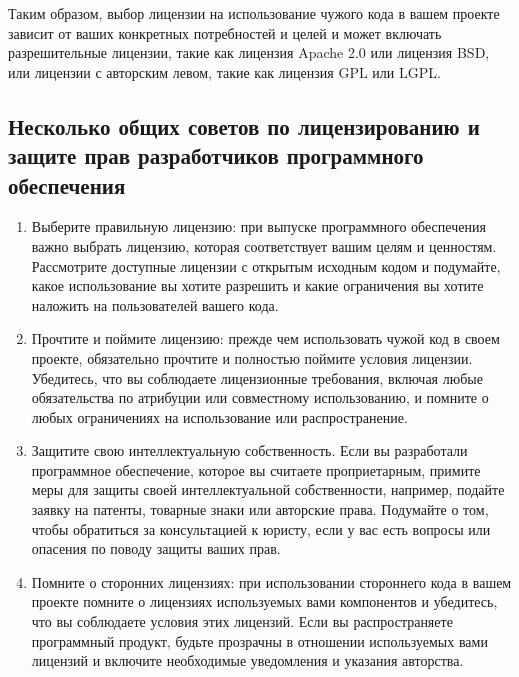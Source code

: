 \documentclass[letterpaper,10pt,russian]{sphinxmanual}
\begin{document}
\sphinxAtStartPar
Таким образом, выбор лицензии на использование чужого кода в вашем проекте зависит от ваших конкретных потребностей и целей и может включать разрешительные лицензии, такие как лицензия Apache 2.0 или лицензия BSD, или лицензии с авторским левом, такие как лицензия GPL или LGPL.


\subsection{Несколько общих советов по лицензированию и защите прав разработчиков программного обеспечения}
\label{\detokenize{educational_materials/open_license/content:id5}}\begin{enumerate}
%
\item {} 
\sphinxAtStartPar
Выберите правильную лицензию: при выпуске программного обеспечения важно выбрать лицензию, которая соответствует вашим целям и ценностям. Рассмотрите доступные лицензии с открытым исходным кодом и подумайте, какое использование вы хотите разрешить и какие ограничения вы хотите наложить на пользователей вашего кода.

\item {} 
\sphinxAtStartPar
Прочтите и поймите лицензию: прежде чем использовать чужой код в своем проекте, обязательно прочтите и полностью поймите условия лицензии. Убедитесь, что вы соблюдаете лицензионные требования, включая любые обязательства по атрибуции или совместному использованию, и помните о любых ограничениях на использование или распространение.

\item {} 
\sphinxAtStartPar
Защитите свою интеллектуальную собственность. Если вы разработали программное обеспечение, которое вы считаете проприетарным, примите меры для защиты своей интеллектуальной собственности, например, подайте заявку на патенты, товарные знаки или авторские права. Подумайте о том, чтобы обратиться за консультацией к юристу, если у вас есть вопросы или опасения по поводу защиты ваших прав.

\item {} 
\sphinxAtStartPar
Помните о сторонних лицензиях: при использовании стороннего кода в вашем проекте помните о лицензиях используемых вами компонентов и убедитесь, что вы соблюдаете условия этих лицензий. Если вы распространяете программный продукт, будьте прозрачны в отношении используемых вами лицензий и включите необходимые уведомления и указания авторства.


\end{enumerate}
\end{document}
